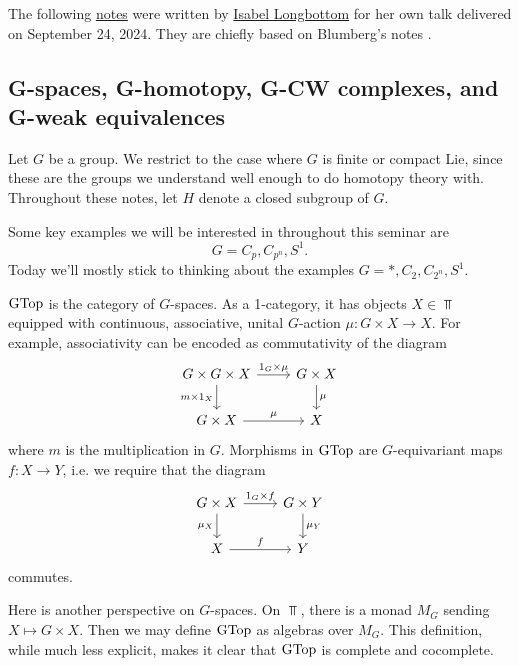 The following \href{https://isabel-prime.github.io/files/eqvt-talk.pdf}{notes} were written by \href{https://isabel-prime.github.io/}{Isabel Longbottom} for her own talk delivered on September 24, 2024.
They are chiefly based on Blumberg's notes \cite{burnside}.

\subsection{G-spaces, G-homotopy, G-CW complexes, and G-weak equivalences}

Let $G$ be a group. We restrict to the case where $G$ is finite or compact Lie, since these are the groups we understand well enough to do homotopy theory with. Throughout these notes, let $H$ denote a closed subgroup of $G$. 

Some key examples we will be interested in throughout this seminar are 
\[G = C_p, C_{p^n}, S^1.\] 
Today we'll mostly stick to thinking about the examples $G = *, C_2, C_{2^n}, S^1$. 

\begin{defn}[$G$-spaces] $\operatorname{GTop}$ is the category of $G$-spaces. As a 1-category, it has objects $X \in \Top$ equipped with continuous, associative, unital $G$-action $\mu: G \times X \to X$. For example, associativity can be encoded as commutativity of the diagram
    \[\begin{tikzcd}
        G \times G \times X \arrow[r, "1_G \times \mu"] \arrow[d, "m \times 1_X"'] & G \times X \arrow[d, "\mu"] \\
        G \times X \arrow[r, "\mu"]                                                & X                          
        \end{tikzcd}\] 
    where $m$ is the multiplication in $G$. Morphisms in $\operatorname{GTop}$ are $G$-equivariant maps $f: X \to Y$, i.e. we require that the diagram 
    \[\begin{tikzcd}
        G \times X \arrow[r, "1_G \times f"] \arrow[d, "\mu_X"'] & G \times Y \arrow[d, "\mu_Y"] \\
        X \arrow[r, "f"]                                         & Y                            
        \end{tikzcd}\]
        commutes.
\end{defn}

\begin{remark}
    Here is another perspective on $G$-spaces. On $\Top$, there is a monad $M_G$ sending $X \mapsto G \times X$. Then we may define $\operatorname{GTop}$ as algebras over $M_G$. This definition, while much less explicit, makes it clear that $\operatorname{GTop}$ is complete and cocomplete.
\end{remark}

